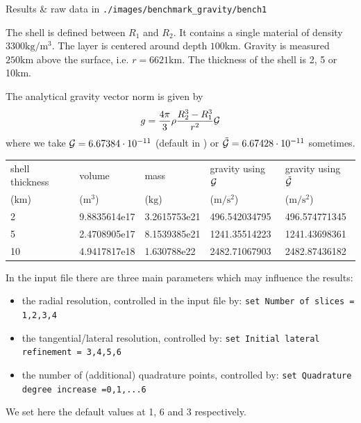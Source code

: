 Results \& raw data in {\tt ./images/benchmark\_gravity/bench1}

The shell is defined between $R_1$ and $R_2$. It contains a single material of 
density $3300\si{\kilogram\per\cubic\meter}$. The layer is centered around depth $100\si{\kilo\metre}$.
Gravity is measured $250\si{\kilo\metre}$ above the surface, i.e. $r=6621\si{\kilo\metre}$.
The thickness of the shell is 2, 5 or 10km.  

The analytical gravity vector norm is given by 
\[
g = \frac{4\pi}{3}\rho \frac{R_2^3-R_1^3}{r^2} {\cal G} 
\]
where we take ${\cal G}=6.67384\cdot10^{-11}$ (default in \aspect{}) or $\tilde{\cal G}=6.67428\cdot 10^{-11}$ sometimes.

\begin{center}
\begin{tabular}{lllll}
\hline
shell thickness      & volume                 & mass                & gravity using ${\cal G}$          & gravity using $\tilde{\cal G}$    \\
($\si{\kilo\metre}$) &  ($\si{\cubic\metre}$) & ($\si{\kilo\gram}$) & ($\si{\metre\per\square\second}$) & ($\si{\metre\per\square\second}$) \\
\hline\hline
2 & 9.8835614e17 & 3.2615753e21 & 496.542034795 &  496.574771345 \\
5 & 2.4708905e17 & 8.1539385e21 & 1241.35514223 & 1241.43698361 \\
10& 4.9417817e18 & 1.630788e22  & 2482.71067903 & 2482.87436182 \\
\hline
\end{tabular}
\end{center}    

In the \aspect{} input file there are three main parameters which may influence the results:
\begin{itemize}
\item the radial resolution, controlled in the input file by: {\tt set Number of slices = 1,2,3,4}
\item the tangential/lateral resolution, controlled by: {\tt set Initial lateral refinement  = 3,4,5,6}
\item the number of (additional) quadrature points, controlled by: {\tt set Quadrature degree increase =0,1,...6}
\end{itemize}
We set here the default values at 1, 6 and 3 respectively.


